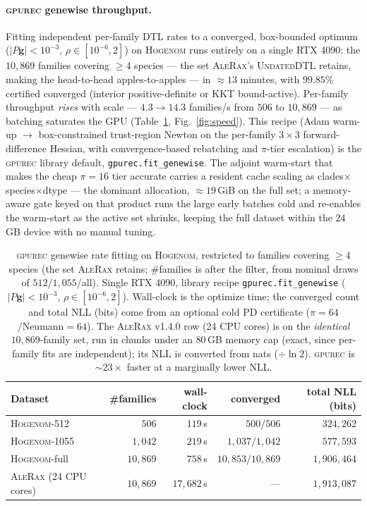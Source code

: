 \documentclass[11pt]{article}
\newcommand{\toolname}{\textsc{gpurec}\xspace}
\newcommand{\grad}{\mathbf{g}}
\begin{document}
\paragraph{\toolname genewise throughput.} Fitting independent per-family DTL
rates to a converged, box-bounded optimum ($|P\grad|<10^{-3}$, $\rho\in[10^{-6},2]$)
on \textsc{Hogenom} runs entirely on a single RTX 4090: the $10{,}869$ families
covering $\geq\!4$ species --- the set \textsc{AleRax}'s \textsc{UndatedDTL} retains,
making the head-to-head apples-to-apples --- in $\approx\!13$ minutes, with
$99.85\%$ certified converged (interior positive-definite or KKT bound-active).
Per-family throughput \emph{rises} with scale --- $4.3\!\to\!14.3$ families/s from
$506$ to $10{,}869$ --- as batching saturates the GPU (Table~\ref{tab:speed},
Fig.~\ref{fig:speed}). This recipe (Adam warm-up $\to$ box-constrained trust-region
Newton on the per-family $3{\times}3$ forward-difference Hessian, with
convergence-based rebatching and $\pi$-tier escalation) is the \toolname library
default, \texttt{gpurec.fit\_genewise}. The adjoint warm-start that makes the cheap
$\pi{=}16$ tier accurate carries a resident cache scaling as
clades${\times}$species${\times}$dtype --- the dominant allocation, $\approx\!19$\,GiB
on the full set; a memory-aware gate keyed on that product runs the large early
batches cold and re-enables the warm-start as the active set shrinks, keeping the
full dataset within the $24$\,GB device with no manual tuning.

\begin{table}[t]\centering
\caption{\toolname genewise rate fitting on \textsc{Hogenom}, restricted to families covering
$\geq\!4$ species (the set \textsc{AleRax} retains; \#families is after the filter, from nominal
draws of $512$/$1{,}055$/all). Single RTX 4090, library recipe \texttt{gpurec.fit\_genewise}
($|P\grad|<10^{-3}$, $\rho\in[10^{-6},2]$). Wall-clock is the optimize time; the converged count
and total NLL (bits) come from an optional cold PD certificate ($\pi{=}64$/Neumann${=}64$). The
\textsc{AleRax} v1.4.0 row (24 CPU cores) is on the \emph{identical} $10{,}869$-family set, run in
chunks under an $80$\,GB memory cap (exact, since per-family fits are independent); its NLL is
converted from nats ($\div\ln 2$). \toolname is $\sim\!23\times$ faster at a marginally lower NLL.}
\label{tab:speed}
\begin{tabular}{lrrr r}
\toprule
Dataset & \#families & wall-clock & converged & total NLL (bits) \\
\midrule
\textsc{Hogenom}-512   & $506$      & $119$\,s   & $500/506$           & $324{,}262$ \\
\textsc{Hogenom}-1055  & $1{,}042$  & $219$\,s   & $1{,}037/1{,}042$   & $577{,}593$ \\
\textsc{Hogenom}-full  & $10{,}869$ & $758$\,s   & $10{,}853/10{,}869$ & $1{,}906{,}464$ \\
\midrule
\textsc{AleRax} (24 CPU cores) & $10{,}869$ & $17{,}682$\,s & ---                 & $1{,}913{,}087$ \\
\bottomrule
\end{tabular}
\end{table}
\end{document}
